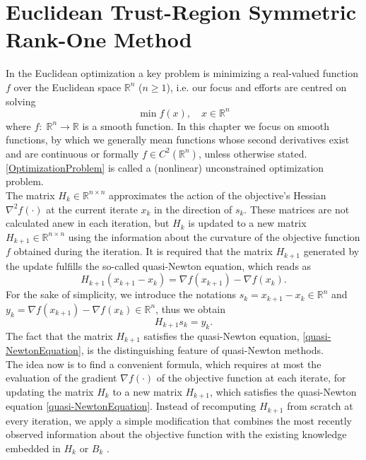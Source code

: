 \chapter{Euclidean Trust-Region Symmetric Rank-One Method}

In the Euclidean optimization a key problem is minimizing a real-valued function $f$ over the Euclidean space $\mathbb{R}^n$ ($n \geq 1$), i.e. our focus and efforts are centred on solving 
\begin{equation}\label{OptimizationProblem}
    \min f(x), \quad x \in \mathbb{R}^n
\end{equation}  
where $f \colon \; \mathbb{R}^n \to \mathbb{R}$ is a smooth function. In this chapter we focus on smooth functions, by which we generally mean functions whose second derivatives exist and are continuous or formally $f \in C^2(\mathbb{R}^n)$, unless otherwise stated. \cref{OptimizationProblem} is called a (nonlinear) unconstrained optimization problem. \\

The matrix $H_k \in \mathbb{R}^{n \times n}$ approximates the action of the objective's Hessian $\nabla^{2} f(\cdot)$ at the current iterate $x_k$ in the direction of $s_k$. These matrices are not calculated anew in each iteration, but $H_k$ is updated to a new matrix $H_{k+1} \in \mathbb{R}^{n \times n}$ using the information about the curvature of the objective function $f$ obtained during the iteration. It is required that the matrix $H_{k+1}$ generated by the update fulfills the so-called quasi-Newton equation, which reads as 
\begin{equation*}
    H_{k+1} (x_{k+1} - x_k) = \nabla f(x_{k+1}) - \nabla f(x_k).
\end{equation*}
For the sake of simplicity, we introduce the notations $s_k = x_{k+1} - x_k \in \mathbb{R}^n$ and $y_k = \nabla f(x_{k+1}) - \nabla f(x_k) \in \mathbb{R}^n$, thus we obtain
\begin{equation}\label{quasi-NewtonEquation}
    H_{k+1} s_k = y_k.
\end{equation}
The fact that the matrix $H_{k+1}$ satisfies the quasi-Newton equation, \cref{quasi-NewtonEquation}, is the distinguishing feature of quasi-Newton methods. \\
The idea now is to find a convenient formula, which requires at most the evaluation of the gradient $\nabla f(\cdot)$ of the objective function at each iterate, for updating the matrix $H_k$ to a new matrix $H_{k+1}$, which satisfies the quasi-Newton equation \cref{quasi-NewtonEquation}. Instead of recomputing $H_{k+1}$ from scratch at every iteration, we apply a simple modification that combines the most recently observed information about the objective function with the existing knowledge embedded in $H_k$ or $B_k$ \cite[p.~139]{NocedalWright:2006}. \\

